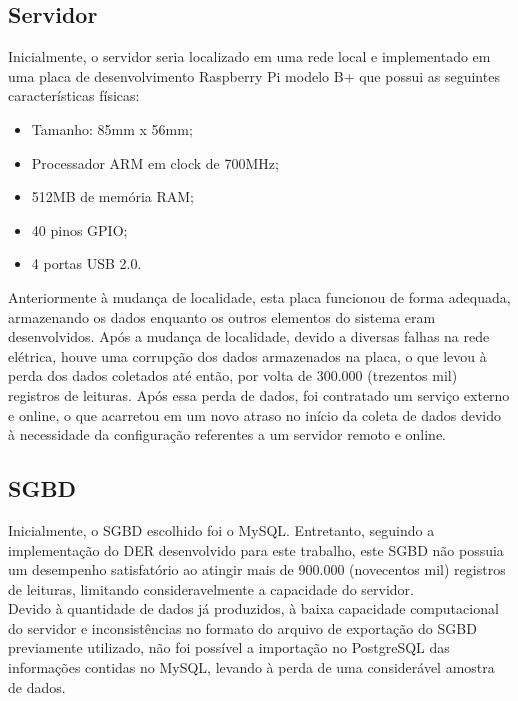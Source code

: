 \subsection{Servidor}
\quad Inicialmente, o servidor seria localizado em uma rede local e implementado em uma placa de desenvolvimento Raspberry Pi modelo B+ que possui as seguintes características físicas:
\begin{itemize}
  \item Tamanho: 85mm x 56mm;
  \item Processador ARM em clock de 700MHz;
  \item 512MB de memória RAM;
  \item 40 pinos GPIO;
  \item 4 portas USB 2.0.
\end{itemize}
\null\quad Anteriormente à mudança de localidade, esta placa funcionou de forma adequada, armazenando os dados enquanto os outros elementos do sistema eram desenvolvidos. Após a mudança de localidade, devido a diversas falhas na rede elétrica, houve uma corrupção dos dados armazenados na placa, o que levou à perda dos dados coletados até então, por volta de 300.000 (trezentos mil) registros de leituras. Após essa perda de dados, foi contratado um serviço externo e online, o que acarretou em um novo atraso no início da coleta de dados devido à necessidade da configuração referentes a um servidor remoto e online.

\subsection{\acrlong{SGBD}}
\quad Inicialmente, o \acrshort{SGBD} escolhido foi o MySQL. Entretanto, seguindo a implementação do \acrshort{DER} desenvolvido para este trabalho, este \acrlong{SGBD} não possuia um desempenho satisfatório ao atingir mais de 900.000 (novecentos mil) registros de leituras, limitando consideravelmente a capacidade do servidor.
\\\null \quad Devido à quantidade de dados já produzidos, à baixa capacidade computacional do servidor e  inconsistências no formato do arquivo de exportação do \acrshort{SGBD} previamente utilizado, não foi possível a importação no PostgreSQL das informações contidas no MySQL, levando à perda de uma considerável amostra de dados.
